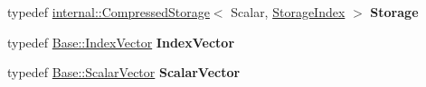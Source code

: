 \begin{DoxyCompactItemize}
typedef \mbox{\hyperlink{class_eigen_1_1internal_1_1_compressed_storage}{internal\+::\+Compressed\+Storage}}$<$ Scalar, \mbox{\hyperlink{class_eigen_1_1_sparse_matrix_base_a0b540ba724726ebe953f8c0df06081ed}{Storage\+Index}} $>$ {\bfseries Storage}
\item 
\mbox{\label{class_eigen_1_1_sparse_matrix_aa1bfa214893284cb97aac510ddd830f8}} 
typedef \mbox{\hyperlink{class_eigen_1_1_matrix}{Base\+::\+Index\+Vector}} {\bfseries Index\+Vector}
\item 
\mbox{\label{class_eigen_1_1_sparse_matrix_acc8bbeac5e5ce882791972f8dce1afd8}} 
typedef \mbox{\hyperlink{class_eigen_1_1_matrix}{Base\+::\+Scalar\+Vector}} {\bfseries Scalar\+Vector}
\end{DoxyCompactItemize}
